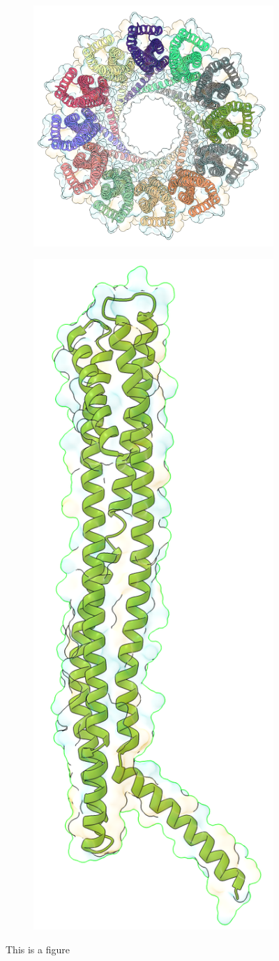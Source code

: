 \begin{figure}[ht]
\begin{centering}
  \begin{subfigure}[t]{\dimexpr.4\linewidth-1.3em\relax}
  \centering
  \includegraphics[width=\linewidth,valign=t]{Figures/clya-top-c.png}
  \end{subfigure}
  \begin{subfigure}[t]{\dimexpr.4\linewidth-1.3em\relax}
  \centering
  \includegraphics[width=.35\linewidth,valign=t]{Figures/clya-mon-c.png}
  \end{subfigure}

  \caption{This is a figure}
  \label{fig:ClyA}
  \end{centering}
\end{figure}

